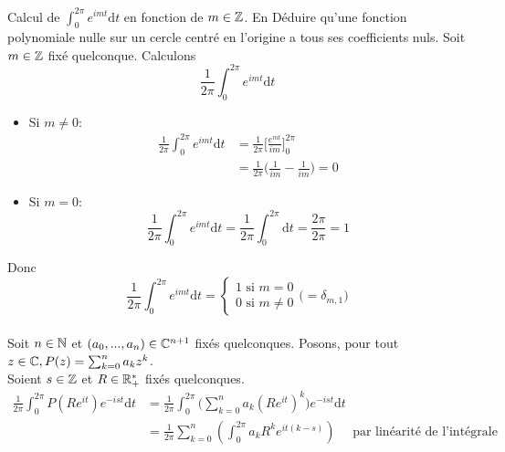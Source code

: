 \documentclass{article}
\renewenvironment{question_kholle}[2][ ]
{
	\subsection{\texorpdfstring{#2}{}}
	\notblank{#1}
	{
		\noindent #1
		\bigbreak
	}
	{}
	\begin{proof}
}
{
	\end{proof}
}
\begin{document}
\pagebreak

\begin{question_kholle}{Calcul de $\displaystyle\int_0^{2\pi}e^{imt} \mathrm d t$ en fonction de $m \in \mathbb Z$. En Déduire qu'une fonction polynomiale nulle sur un cercle centré en l'origine a tous ses coefficients nuls.}
  Soit $m \in \mathbb Z$ fixé quelconque. Calculons
  $$\frac{1}{2 \pi} \int_0^{2\pi}e^{imt} \mathrm d t$$
  \begin{itemize}[label=$\star$]
    \item Si $m \neq 0$:
          \begin{align*}
            \frac{1}{2 \pi} \int_0^{2\pi}e^{imt} \mathrm d t & = \frac{1}{2 \pi} \Big[ \frac{e^{mt}}{im} \Big]_0^{2\pi}      \\
                                                             & = \frac{1}{2 \pi} \Big( \frac{1}{im} - \frac{1}{im} \Big) = 0
          \end{align*}
    \item Si $m = 0$:
          $$
            \frac{1}{2 \pi} \int_0^{2\pi}e^{imt} \mathrm d t = \frac{1}{2 \pi} \int_0^{2\pi} \mathrm d t = \frac{2 \pi}{2 \pi} = 1
          $$
  \end{itemize}
  Donc $$\frac{1}{2 \pi} \int_0^{2\pi}e^{imt} \mathrm d t =
    \begin{cases}
      1 \text{ si } m=0 \\
      0 \text{ si } m \neq 0
    \end{cases}
    \bigl(= \delta_{m, 1}\bigr)
  $$
  \\
  Soit $n\in \mathbb N$ et $(a_0, ..., a_n) \in \mathbb C^{n+1}$ fixés quelconques. Posons, pour tout $z\in\mathbb C, P(z) = \sum_{k=0}^n a_k z^k$.\\
  Soient $s\in\mathbb Z$ et $R\in\mathbb R_+^*$ fixés quelconques.
  \begin{align*}
    \frac{1}{2 \pi} \int_0^{2\pi} P(Re^{it}) e^{-ist} \mathrm d t & = \frac{1}{2 \pi} \int_0^{2\pi} \bigg (\sum_{k=0}^n a_k (Re^{it})^k \bigg) e^{-ist} \mathrm d t                                                                                                                                                                                                                                                     \\
                                                                  & = \frac{1}{2\pi}\sum_{k=0}^{n}\left(\int_{0}^{2\pi}a_kR^ke^{it(k-s)}\right)                                                                                                                                                                                                                               \quad\text{ par linéarité de l'intégrale} \\

\end{align*}
\end{question_kholle}
\end{document}
